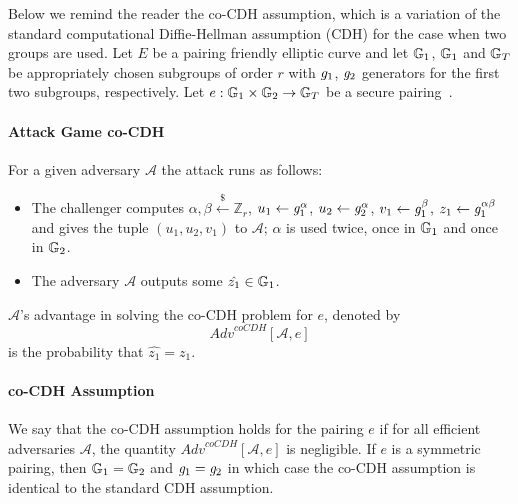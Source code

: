 \noindent Below we remind the reader the co-CDH assumption, which is a variation of the standard computational Diffie-Hellman assumption (CDH)
for the case when two groups are used. Let $E$ be a pairing friendly elliptic curve and 
let $\mathbb{G}_{1}$, $\mathbb{G}_{1}$ and $\mathbb{G}_{T}$ be appropriately chosen subgroups of order $r$ with  $\mathit{g}_{1}$, $\mathit{g}_{2}$ 
generators for the first two subgroups, respectively. Let $e: \mathbb{G}_{1} \times \mathbb{G}_{2} \rightarrow \mathbb{G}_{T}$ be a secure 
pairing~\cite{secure_pairings,pairings_for_cryptographers}. 
\paragraph{Attack Game co-CDH} For a given adversary $\mathcal{A}$ the attack runs as follows:
\begin{itemize}
\item The challenger computes $\alpha, \beta \xleftarrow{\$} \mathbb{Z}_r$, $u_1 \leftarrow \mathit{g}_{1}^{\alpha}$, $u_2 \leftarrow \mathit{g}_{2}^{\alpha}$,   
$v_1 \leftarrow \mathit{g}_{1}^{\beta}$, $z_1 \leftarrow \mathit{g}_{1}^{\alpha\beta}$ and gives the tuple $(u_1, u_2, v_1)$ to $\mathcal{A}$; $\alpha$ is used twice, 
once in $\mathbb{G}_{1}$ and once in $\mathbb{G}_{2}$. 
\item The adversary $\mathcal{A}$ outputs some $\hat{z_1} \in \mathbb{G}_{1}$.
\end{itemize}
\noindent $\mathcal{A}$'s advantage in solving the co-CDH problem for $e$, denoted by $$\mathit{Adv}^{\mathit{coCDH}}[\mathcal{A},e]$$ is the probability 
that $\hat{z_1} = z_1$.
\paragraph{co-CDH Assumption} We say that the co-CDH assumption holds for the pairing $e$ if for all efficient adversaries $\mathcal{A}$, 
the quantity $\mathit{Adv}^{\mathit{coCDH}}[\mathcal{A},e]$ is negligible.
If $e$ is a symmetric pairing, then $\mathbb{G}_{1} = \mathbb{G}_{2}$ and $\mathit{g}_{1} = \mathit{g}_{2}$ in which case the co-CDH assumption is identical to the standard CDH assumption.